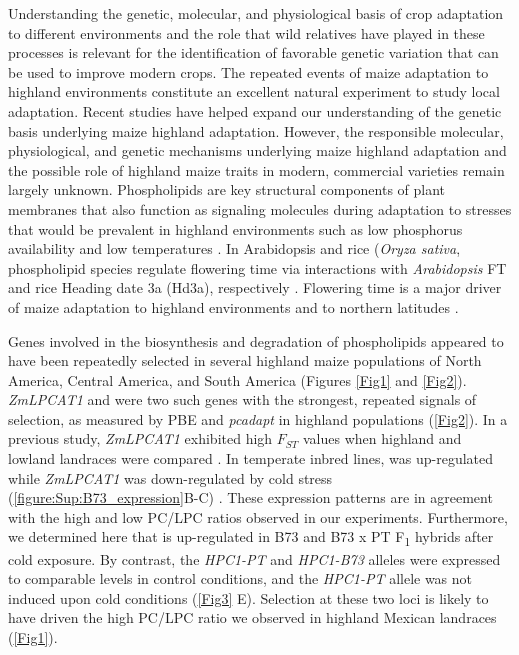 Understanding the genetic, molecular, and physiological basis of crop adaptation to different environments and the role that wild relatives have played in these processes is relevant for the identification of favorable genetic variation that can be used to improve modern crops.
The repeated events of maize adaptation to highland environments constitute an excellent natural experiment to study local adaptation. 
Recent studies \citep{wang2020-mp, takuno2015-uj, crow2020} have helped expand our understanding of the genetic basis underlying maize highland adaptation. 
However, the responsible molecular, physiological, and genetic mechanisms underlying maize highland adaptation and the possible role of highland maize traits in modern, commercial varieties remain largely unknown.
Phospholipids are key structural components of plant membranes that also function as signaling molecules during adaptation to stresses that would be prevalent in highland environments \citep{ryu2004-iv, nakamura2017-vb} such as low phosphorus availability \citep{veneklaas2012-ls, cruz-ramirez2004-ib, lambers2012-an} and low temperatures \citep{degenkolbe2012-wf, welti2002-uk, marla2017-ph}. 
In Arabidopsis and rice (\textit{Oryza sativa}, phospholipid species regulate flowering time via interactions with \textit{Arabidopsis} FT and rice Heading date 3a (Hd3a), respectively \citep{nakamura2014-qf, susila2021-dz, qu2021-wc}. 
Flowering time is a major driver of maize adaptation to highland environments \citep{romero_navarro2017-cn, gates2019-xu, mercer2019-vj} and to northern latitudes \citep{hung2012-ms, swarts2017-ge}.

Genes involved in the biosynthesis and degradation of phospholipids appeared to have been repeatedly selected in several highland maize populations of North America, Central America, and South America (Figures \autoref{Fig1} and \autoref{Fig2}). 
\textit{ZmLPCAT1} and \hpc were two such genes with the strongest, repeated signals of selection, as measured by PBE and \textit{pcadapt} in highland populations (\autoref{Fig2}). 
In a previous study, \textit{ZmLPCAT1} exhibited high $F_{ST}$ values when highland and lowland landraces were compared \citep{takuno2015-uj}.
In temperate inbred lines, \hpc was up-regulated while \textit{ZmLPCAT1} was down-regulated by cold stress (\autoref{figure:Sup:B73_expression}B-C) \citep{waters2017-nat}.
These expression patterns are in agreement with the high and low PC/LPC ratios observed in our experiments. 
Furthermore, we determined here that \hpc is up-regulated in B73 and B73 x PT F\textsubscript{1} hybrids after cold exposure. 
By contrast, the \textit{HPC1-PT} and \textit{HPC1-B73} alleles were expressed to comparable levels in control conditions, and the \textit{HPC1-PT} allele was not induced upon cold conditions (\autoref{Fig3} E).
Selection at these two loci is likely to have driven the high PC/LPC ratio we observed in highland Mexican landraces (\autoref{Fig1}). 

